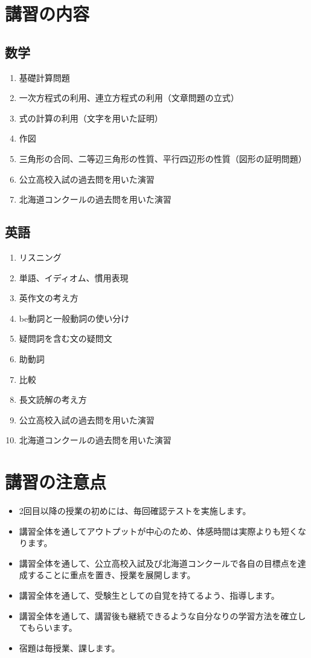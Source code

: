 \documentclass[a4j,12pt]{jsarticle}
\begin{document}
\section{講習の内容}
  \subsection{数学}
    \begin{enumerate}
      \item 基礎計算問題
      \item 一次方程式の利用、連立方程式の利用（文章問題の立式）
      \item 式の計算の利用（文字を用いた証明）
      \item 作図
      \item 三角形の合同、二等辺三角形の性質、平行四辺形の性質（図形の証明問題）
      \item 公立高校入試の過去問を用いた演習
      \item 北海道コンクールの過去問を用いた演習
    \end{enumerate}

  \subsection{英語}
    \begin{enumerate}
      \item リスニング
      \item 単語、イディオム、慣用表現
      \item 英作文の考え方
      \item be動詞と一般動詞の使い分け
      \item 疑問詞を含む文の疑問文
      \item 助動詞
      \item 比較
      \item 長文読解の考え方
      \item 公立高校入試の過去問を用いた演習
      \item 北海道コンクールの過去問を用いた演習
    \end{enumerate}

\section{講習の注意点}
    \begin{itemize}
      \item 2回目以降の授業の初めには、毎回確認テストを実施します。
      \item 講習全体を通してアウトプットが中心のため、体感時間は実際よりも短くなります。
      \item 講習全体を通して、公立高校入試及び北海道コンクールで各自の目標点を達成することに重点を置き、授業を展開します。
      \item 講習全体を通して、受験生としての自覚を持てるよう、指導します。
      \item 講習全体を通して、講習後も継続できるような自分なりの学習方法を確立してもらいます。
      \item 宿題は毎授業、課します。
    \end{itemize}
\end{document}

